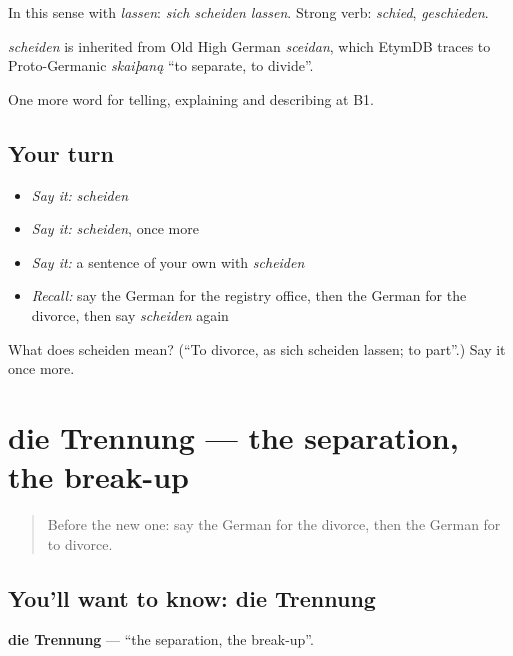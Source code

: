 In this sense with \emph{lassen}: \emph{sich scheiden lassen}. Strong verb: \emph{schied}, \emph{geschieden}.

\begin{cousinweb}
\emph{scheiden} is inherited from Old High German \emph{sceidan}, which EtymDB traces to Proto-Germanic \emph{skaiþaną} \textquotedblleft{}to separate, to divide\textquotedblright{}.
\end{cousinweb}

\begin{grammarlens}[title={What you've built}]
One more word for telling, explaining and describing at B1.
\end{grammarlens}

\subsection*{Your turn}
\begin{itemize}
\raggedright
  \item \emph{Say it:} \emph{scheiden}
  \item \emph{Say it:} \emph{scheiden}, once more
  \item \emph{Say it:} a sentence of your own with \emph{scheiden}
  \item \emph{Recall:} say the German for the registry office, then the German for the divorce, then say \emph{scheiden} again
\end{itemize}

\begin{tcolorbox}[breakable,colback=teal!4,colframe=teal!35!black,title={Before you move on}]
What does scheiden mean? (\textquotedblleft{}To divorce, as sich scheiden lassen; to part\textquotedblright{}.) Say it once more.
\end{tcolorbox}
\section[die Trennung]{die Trennung — the separation, the break-up}

\label{lesson:GE-C300-trennung}



\begin{quote}
Before the new one: say the German for the divorce, then the German for to divorce.
\end{quote}

\subsection*{You'll want to know: die Trennung}
\textbf{die Trennung} — \textquotedblleft{}the separation, the break-up\textquotedblright{}.

